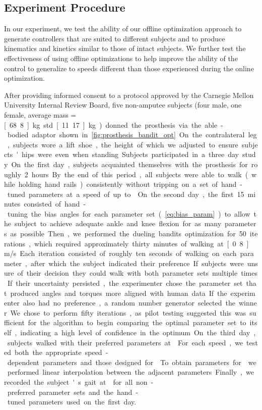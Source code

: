 \subsection{Experiment Procedure}
In our experiment, we test the ability of our offline optimization approach to
generate controllers that are suited to different subjects and to produce
kinematics and kinetics similar to those of intact subjects. We further test the
effectiveness of using offline optimizations to help improve the ability of the
control to generalize to speeds different than those experienced during the
online optimization.

After providing informed consent to a protocol approved by the Carnegie Mellon
University Internal Review Board, five non-amputee subjects (four male, one
female, average mass = \unit[68.8]{kg} std \unit[11.17]{kg}) donned the
prosthesis via the able-bodied adaptor shown in
\cref{fig:prosthesis_bandit_opt}. On the contralateral leg, subjects wore a lift
shoe, the height of which we adjusted to ensure subjects' hips were even when
standing.

Subjects participated in a three day study. On the first day, subjects
acquainted themselves with the prosthesis for roughly 2 hours. By the end of
this period, all subjects were able to walk (while holding hand rails)
consistently without tripping on a set of hand-tuned parameters at a speed of up
to . On the second day, the first 15 minutes consisted of
hand-tuning the bias angles for each parameter set (\cref{eq:bias_param}) to
allow the subject to achieve adequate ankle and knee flexion for as many
parameters as possible. Then, we performed the dueling bandits optimization for
50 iterations, which required approximately thirty minutes of walking at
\unit[0.8]{m/s}. Each iteration consisted of roughly ten seconds of walking on
each parameter, after which the subject indicated their preference. If subjects
were unsure of their decision they could walk with both parameter sets multiple
times. If their uncertainty persisted, the experimenter chose the parameter set
that produced angles and torques more aligned with human data.  If the
experimenter also had no preference, a random number generator selected the
winner. We chose to perform fifty iterations, as pilot testing suggested this
was sufficient for the algorithm to begin comparing the optimal parameter set to
itself, indicating a high level of confidence in the optimum.

On the third day, subjects walked with their preferred parameters at
. For each speed, we tested both the
appropriate speed-dependent parameters and those designed for
. To obtain parameters for  we
performed linear interpolation between the adjacent parameters.  Finally, we
recorded the subject's gait at  for all non-preferred
parameter sets and the hand-tuned parameters used on the first day. 

